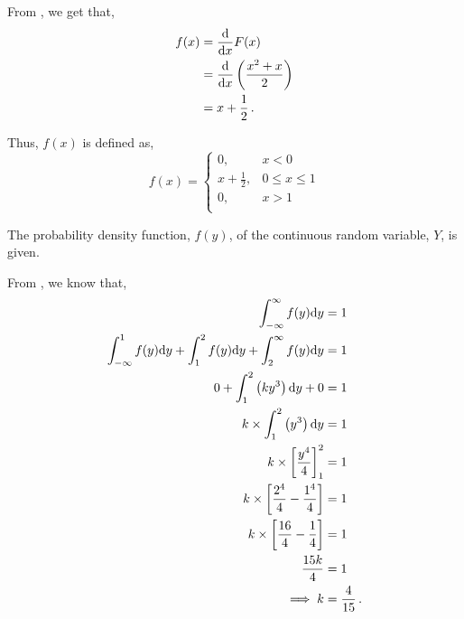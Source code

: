 \begin{subquestions}
\begin{subsubquestions}

\subsubquestion

From , we get that,
\begin{align}
	f(x) & = \frac{\mathrm{d}}{\mathrm{d}x} F(x) \nonumber \\
	     & = \frac{\mathrm{d}}{\mathrm{d}x}\left(\frac{x^2+x}{2} \right) \nonumber \\
	     & = x + \frac{1}{2} \,.
\end{align}

Thus, $f(x)$ is defined as,
\[ f(x) = 
\begin{cases}
	0, & x<0 \\
	x + \frac{1}{2}, & 0 \leq  x \leq 1 \\
	0, & x>1 \\
\end{cases}
\]

\end{subsubquestions}	
	

\subquestion

The probability density function, $f(y)$, of the continuous random variable, $Y$, is given.

\begin{subsubquestions}
	
\subsubquestion

From , we know that,
\begin{align}
	\int_{-\infty}^{\infty} f(y)\mathrm{d}y & = 1 \nonumber \\
	\int_{-\infty}^{1} f(y)\mathrm{d}y + \int_{1}^{2} f(y)\mathrm{d}y + \int_{2}^{\infty} f(y)\mathrm{d}y & = 1 \nonumber \\
	0 + \int_{1}^{2} \left(ky^3\right)\mathrm{d}y + 0 & = 1 \nonumber \\
	k \times \int_{1}^{2} \left(y^3\right)\mathrm{d}y & = 1 \nonumber \\
	k \times \left[\frac{y^4}{4} \right]^2_1 & = 1 \nonumber \\
	k \times \left[\frac{2^4}{4} - \frac{1^4}{4}\right] & = 1 \nonumber \\
	k \times \left[\frac{16}{4}- \frac{1}{4}\right] & = 1 \nonumber \\
	\frac{15k}{4} & = 1 \nonumber \\
	\implies k & = \frac{4}{15} \,.
\end{align}
	

\end{subsubquestions}
\end{subquestions}
